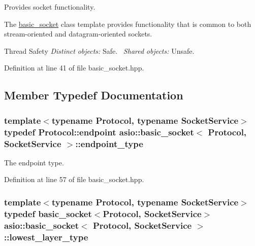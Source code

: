 Provides socket functionality. 

The \hyperlink{classasio_1_1basic__socket}{basic\+\_\+socket} class template provides functionality that is common to both stream-\/oriented and datagram-\/oriented sockets.

\begin{DoxyParagraph}{Thread Safety}
{\itshape Distinct} {\itshape objects\+:} Safe.~\newline
{\itshape Shared} {\itshape objects\+:} Unsafe. 
\end{DoxyParagraph}


Definition at line 41 of file basic\+\_\+socket.\+hpp.



\subsection{Member Typedef Documentation}
\hypertarget{classasio_1_1basic__socket_a6b2ba27d020bb24356c691f19f8d2829}{}
\subsubsection[{endpoint\+\_\+type}]{\setlength{\rightskip}{0pt plus 5cm}template$<$typename Protocol, typename Socket\+Service$>$ typedef Protocol\+::endpoint {\bf asio\+::basic\+\_\+socket}$<$ Protocol, Socket\+Service $>$\+::{\bf endpoint\+\_\+type}}\label{classasio_1_1basic__socket_a6b2ba27d020bb24356c691f19f8d2829}


The endpoint type. 



Definition at line 57 of file basic\+\_\+socket.\+hpp.

\hypertarget{classasio_1_1basic__socket_a7e749e9f9d470ab881564bd549473d2f}{}
\subsubsection[{lowest\+\_\+layer\+\_\+type}]{\setlength{\rightskip}{0pt plus 5cm}template$<$typename Protocol, typename Socket\+Service$>$ typedef {\bf basic\+\_\+socket}$<$Protocol, Socket\+Service$>$ {\bf asio\+::basic\+\_\+socket}$<$ Protocol, Socket\+Service $>$\+::{\bf lowest\+\_\+layer\+\_\+type}}\label{classasio_1_1basic__socket_a7e749e9f9d470ab881564bd549473d2f}



